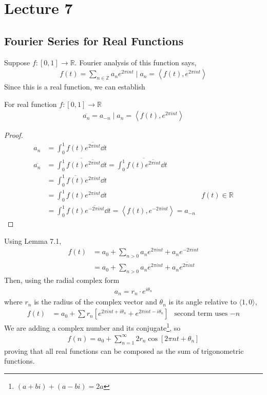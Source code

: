 \section{Lecture 7}
\subsection{Fourier Series for Real Functions}
Suppose $f: [0,1] \to \mathbb{R}$. Fourier analysis of this function says,
\begin{align}
    f(t) = \sum_{n \in \mathbb{Z}} a_n e^{2\pi int} \mid a_n = \left\langle f(t), e^{2\pi int} \right\rangle
\end{align}
Since this is a real function, we can establish
\begin{lemma}
    For real function $f: [0,1] \to \mathbb{R}$
    \begin{align}
        \overline{a_n} = a_{-n} \mid a_n = \left\langle f(t), e^{2\pi int} \right\rangle
    \end{align}
\end{lemma}
\begin{proof}
    \begin{align*}
        a_n &= \int_0^1 f(t) \overline{e^{2\pi int}} \dd{t}\\
        \overline{a_n} &= \overline{\int_0^1 f(t) \overline{e^{2\pi int}} \dd{t}} = \int_0^1 \overline{f(t) \overline{e^{2\pi int}}} \dd{t}\\
        &= \int_0^1 \overline{f(t)} e^{2\pi int} \dd{t}\\
        &= \int_0^1 f(t) e^{2\pi int} \dd{t} & f(t) \in \mathbb{R}\\
        &= \int_0^1 f(t) \overline{e^{-2\pi int}} \dd{t} = \left\langle f(t), e^{-2\pi int} \right\rangle = a_{-n}
    \end{align*}
\end{proof}
\noindent Using Lemma 7.1,
\begin{align}
    f(t) &= a_0 + \sum_{n > 0} a_n e^{2\pi int} + a_n e^{-2\pi int}\\
    &= a_0 + \sum_{n > 0} a_n e^{2\pi int} + a_n \overline{e^{2\pi int}}
\end{align}
Then, using the radial complex form
\begin{align}
    a_n = r_n \cdot e^{i\theta_n}
\end{align}
where $r_n$ is the radius of the complex vector and $\theta_n$ is its angle relative to $\langle 1, 0\rangle$,
\begin{align}
    f(t) &= a_0 + \sum r_n \left[ e^{2\pi int + i\theta_n} + e^{2\pi int - i\theta_n} \right] & \text{second term uses $-n$}
\end{align}
We are adding a complex number and its conjugate\footnote{$(a + bi) + (a - bi) = 2a$}, so
\begin{align}
    \boxed{f(n) = a_0 + \sum_{n=1}^\infty 2r_n \cos\left[ 2\pi nt + \theta_n \right]}
\end{align}
proving that all real functions can be composed as the sum of trigonometric functions.

